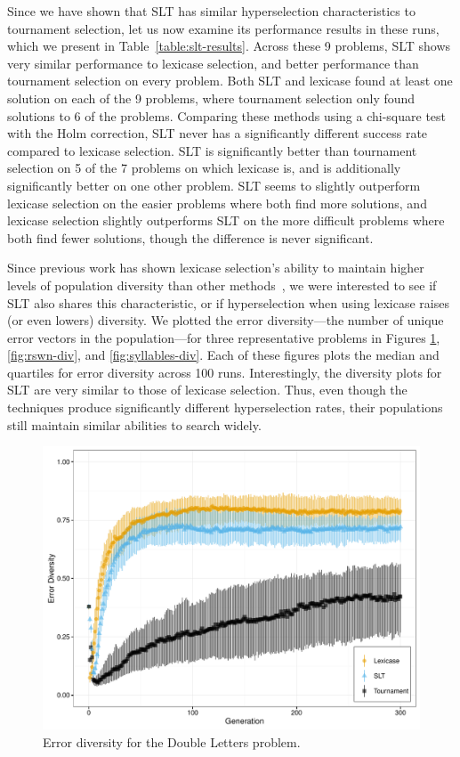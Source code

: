 \documentclass{sig-alternate}
\begin{document}
Since we have shown that SLT has similar hyperselection characteristics to tournament selection, let us now examine its performance results in these runs, which we present in Table~\ref{table:slt-results}. Across these 9 problems, SLT shows very similar performance to lexicase selection, and better performance than tournament selection on every problem. Both SLT and lexicase found at least one solution on each of the 9 problems, where tournament selection only found solutions to 6 of the problems. Comparing these methods using a chi-square test with the Holm correction, SLT never has a significantly different success rate compared to lexicase selection. SLT is significantly better than tournament selection on 5 of the 7 problems on which lexicase is, and is additionally significantly better on one other problem.
 SLT seems to slightly outperform lexicase selection on the easier problems where both find more solutions, and lexicase selection slightly outperforms SLT on the more difficult problems where both find fewer solutions, though the difference is never significant.

Since previous work has shown lexicase selection's ability to maintain higher levels of population diversity than other methods~\cite{Helmuth:2015:GPTP}, we were interested to see if SLT also shares this characteristic, or if hyperselection when using lexicase raises (or even lowers) diversity. We plotted the error diversity---the number of unique error vectors in the population---for three representative problems in Figures \ref{fig:dl-div}, \ref{fig:rswn-div}, and \ref{fig:syllables-div}. Each of these figures plots the median and quartiles for error diversity across 100 runs. Interestingly, the diversity plots for SLT are very similar to those of lexicase selection. Thus, even though the techniques produce significantly different hyperselection rates, their populations still maintain similar abilities to search widely.

\begin{figure}[t] %
\centering
\includegraphics[width=\linewidth]{double-letters-div.pdf}
\caption{Error diversity for the Double Letters problem.}
\label{fig:dl-div}
\end{figure}
\end{document}

